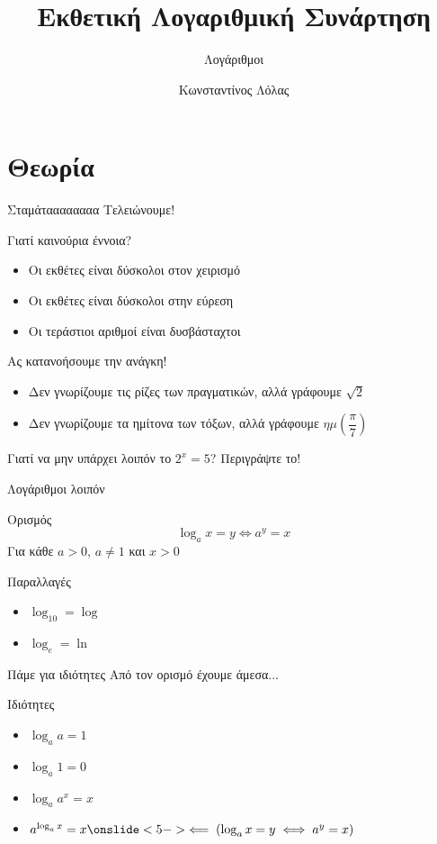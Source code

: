 \documentclass{presentation}
\title{Εκθετική Λογαριθμική Συνάρτηση}
\subtitle{Λογάριθμοι}
\author[Λόλας]{Κωνσταντίνος Λόλας}
\date{}
\begin{document}
\begin{frame}
  \titlepage
\end{frame}

\section{Θεωρία}
\begin{frame}{Σταμάταααααααα}
  Τελειώνουμε!
\end{frame}

\begin{frame}{Γιατί καινούρια έννοια?}
  \begin{itemize}
    \item<1-> Οι εκθέτες είναι δύσκολοι στον χειρισμό
    \item<2-> Οι εκθέτες είναι δύσκολοι στην εύρεση
    \item<3-> Οι τεράστιοι αριθμοί είναι δυσβάσταχτοι
  \end{itemize}
\end{frame}

\begin{frame}{Ας κατανοήσουμε την ανάγκη!}
  \begin{itemize}
    \item<1-> Δεν γνωρίζουμε τις ρίζες των πραγματικών, αλλά γράφουμε $\sqrt{2}$
    \item<2-> Δεν γνωρίζουμε τα ημίτονα των τόξων, αλλά γράφουμε $ημ(\dfrac{π}{7})$
  \end{itemize}
   Γιατί να μην υπάρχει λοιπόν το $2^x=5$? Περιγράψτε το!
\end{frame}

\begin{frame}[label=Θεωρία1]{Λογάριθμοι λοιπόν}
  \begin{block}{Ορισμός}
    $$\log_ax=y\iff a^y=x$$
    Για κάθε $a>0$, $a\ne 1$ και $x>0$
  \end{block}
  \begin{exampleblock}{Παραλλαγές}
    \begin{itemize}
      \item $\log_{10}=\log$
      \item $\log_e=\ln$
    \end{itemize}
  \end{exampleblock}
  \hyperlink{Άσκηση1}{}
\end{frame}

\begin{frame}{Πάμε για ιδιότητες}
  Από τον ορισμό έχουμε άμεσα...
  \begin{block}{Ιδιότητες}
    \begin{itemize}
      \item<1-> $\log_aa=1$
      \item<2-> $\log_a1=0$
      \item<3-> $\log_aa^x=x$
      \item<4-> $a^{\log_ax}=x \onslide<5-> \impliedby \left( \log_ax=y\iff a^y=x \right) $
    \end{itemize}
  \end{block}
\end{frame}
\end{document}
